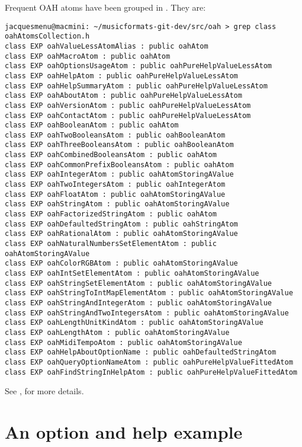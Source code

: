 {Frequent OAH atoms have been grouped in . They are:
\begin{lstlisting}[language=Terminal]
jacquesmenu@macmini: ~/musicformats-git-dev/src/oah > grep class   oahAtomsCollection.h
class EXP oahValueLessAtomAlias : public oahAtom
class EXP oahMacroAtom : public oahAtom
class EXP oahOptionsUsageAtom : public oahPureHelpValueLessAtom
class EXP oahHelpAtom : public oahPureHelpValueLessAtom
class EXP oahHelpSummaryAtom : public oahPureHelpValueLessAtom
class EXP oahAboutAtom : public oahPureHelpValueLessAtom
class EXP oahVersionAtom : public oahPureHelpValueLessAtom
class EXP oahContactAtom : public oahPureHelpValueLessAtom
class EXP oahBooleanAtom : public oahAtom
class EXP oahTwoBooleansAtom : public oahBooleanAtom
class EXP oahThreeBooleansAtom : public oahBooleanAtom
class EXP oahCombinedBooleansAtom : public oahAtom
class EXP oahCommonPrefixBooleansAtom : public oahAtom
class EXP oahIntegerAtom : public oahAtomStoringAValue
class EXP oahTwoIntegersAtom : public oahIntegerAtom
class EXP oahFloatAtom : public oahAtomStoringAValue
class EXP oahStringAtom : public oahAtomStoringAValue
class EXP oahFactorizedStringAtom : public oahAtom
class EXP oahDefaultedStringAtom : public oahStringAtom
class EXP oahRationalAtom : public oahAtomStoringAValue
class EXP oahNaturalNumbersSetElementAtom : public oahAtomStoringAValue
class EXP oahColorRGBAtom : public oahAtomStoringAValue
class EXP oahIntSetElementAtom : public oahAtomStoringAValue
class EXP oahStringSetElementAtom : public oahAtomStoringAValue
class EXP oahStringToIntMapElementAtom : public oahAtomStoringAValue
class EXP oahStringAndIntegerAtom : public oahAtomStoringAValue
class EXP oahStringAndTwoIntegersAtom : public oahAtomStoringAValue
class EXP oahLengthUnitKindAtom : public oahAtomStoringAValue
class EXP oahLengthAtom : public oahAtomStoringAValue
class EXP oahMidiTempoAtom : public oahAtomStoringAValue
class EXP oahHelpAboutOptionName : public oahDefaultedStringAtom
class EXP oahQueryOptionNameAtom : public oahPureHelpValueFittedAtom
class EXP oahFindStringInHelpAtom : public oahPureHelpValueFittedAtom
\end{lstlisting}

See , for more details.


\section{An option and help example}

}
